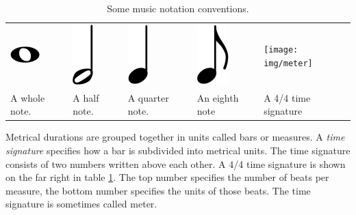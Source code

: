 \begin{table}
\caption{Some music notation conventions.}
\label{tab:notation}
\centering
\begin{tabular}{lllll}
\parbox{0.15\linewidth}{
\centering
\includegraphics[scale=0.5]{img/whole_note}
}
&
\parbox{0.15\linewidth}{
\centering
\includegraphics[scale=0.5]{img/half_note}
}
&
\parbox{0.15\linewidth}{
\centering
\includegraphics[scale=0.5]{img/quarter_note}
}
&
\parbox{0.15\linewidth}{
\centering
\includegraphics[scale=0.5]{img/eighth_note}
}
&
\parbox{0.15\linewidth}{
\centering
\texttt{[image: img/meter]}
}
\\
A whole note. & A half note. & A quarter note. & An eighth note & A 4/4 time signature\\

\end{tabular}
\end{table}

Metrical durations are grouped together in units called bars or measures. A \textit{time signature} specifies how a bar is subdivided into metrical units. The time signature consists of two numbers written above each other. A 4/4 time signature is shown on the far right in table \ref{tab:notation}. The top number specifies the number of beats per measure, the bottom number specifies the units of those beats. The time signature is sometimes called meter.

